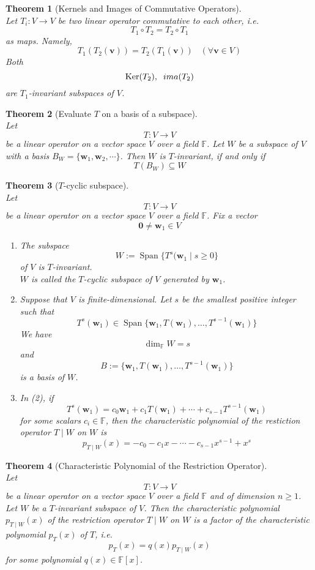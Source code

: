 \documentclass[12pt]{article}
\newcommand{\kerne}{\mathrm{Ker}}
\newcommand{\ima}{\mathrm{Im}}
\newtheorem{theorem}{Theorem}[section]
\theoremstyle{definition}
\DeclareMathOperator{\spn}{Span}
\begin{document}
\begin{theorem}[Kernels and Images of Commutative Operators]
\hfill\\\normalfont Let $T_i:V\to V$ be two linear operator commutative to each other, i.e.
\[
T_1\circ T_2 = T_2\circ T_1
\]
as maps. Namely,
\[
T_1(T_2(\mathbf{v}))=T_2(T_1(\mathbf{v}))\;\;\;(\forall \mathbf{v}\in V)
\]
Both
\[
\kerne(T_2),\;\;\;\\ima(T_2)
\]
are $T_1$-invariant subspaces of $V$.
\end{theorem}
\begin{theorem}[Evaluate $T$ on a basis of a subspace]
\hfill\\\normalfont 
Let
\[
T:V\to V
\] 
be a linear operator on a vector space $V$ over a field $\mathbb{F}$. Let $W$ be a subspace of $V$ with a basis $B_W = \{\mathbf{w}_1,\mathbf{w}_2,\cdots\}$. Then $W$ is $T$-invariant, if and only if
\[
T(B_W)\subseteq W
\]
\end{theorem}
\begin{theorem}[$T$-cyclic subspace]
\hfill\\\normalfont Let
\[
T:V\to V
\]
be a linear operator on a vector space $V$ over a field $\mathbb{F}$. Fix a vector
\[
\mathbf{0}\neq \mathbf{w}_1\in V
\]
\begin{enumerate}
\item The subspace
\[
W:=\spn\{T^s(\mathbf{w}_1\mid s\geq 0\}
\]
of $V$ is $T$-invariant.\\
$W$ is called the $T$-cyclic subspace of $V$ generated by $\mathbf{w}_1$.
\item Suppose that $V$ is finite-dimensional. Let $s$ be the smallest positive integer such that
\[
T^s(\mathbf{w}_1)\in \spn\{\mathbf{w}_1, T(\mathbf{w}_1),\ldots, T^{s-1}(\mathbf{w}_1)\}
\]
We have
\[
\dim_\mathbb{F}W=s
\]
and
\[
B:=\{\mathbf{w}_1, T(\mathbf{w}_1),\ldots, T^{s-1}(\mathbf{w}_1)\}
\]
is a basis of $W$.
\item In (2), if
\[
T^s(\mathbf{w}_1)=c_0\mathbf{w}_1+c_1 T(\mathbf{w}_1)+\cdots+c_{s-1} T^{s-1}(\mathbf{w}_1)
\]
for some scalars $c_i\in \mathbb{F}$, then the characteristic polynomial of the restiction operator $T\mid W$ on $W$ is
\[
p_{T\mid W}(x)=-c_0-c_1x-\cdots-c_{s-1}x^{s-1}+x^s
\]
\end{enumerate}
\end{theorem}
\begin{theorem}[Characteristic Polynomial of the Restriction Operator]
\hfill\\\normalfont
Let
\[
T:V\to V
\]
be a linear operator on a vector space $V$ over a field $\mathbb{F}$ and of dimension $n\geq 1$. Let $W$ be a $T$-invariant subspace of $V$. Then the characteristic polynomial $p_{T\mid W}(x)$ of the restriction operator $T\mid W$ on $W$ is a factor of the characteristic polynomial $p_T(x)$ of $T$, i.e.
\[
p_T(x)=q(x)p_{T\mid W}(x)
\]
for some polynomial $q(x)\in \mathbb{F}[x]$.
\end{theorem}
\end{document}
